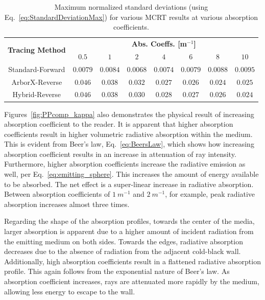\begin{table}
\centering
\caption{Maximum normalized standard deviations (using Eq.~\ref{eq:StandardDeviationMax}) for various MCRT results at various absorption coefficients.}
\begin{tabular}{c c c c c c c c} 
\hline
\multirow{ 2}{*}{\bfseries Tracing Method} & 
\multicolumn{7}{c}{\bfseries Abs. Coeffs. [m$^{-1}$]} \\ [0.5ex] \cline{2-8}
 & $0.5$ & $1$ & $2$ & $4$ & $6$ & $8$ & $10$\\ [0.5ex]
 \hline
 Standard-Forward & $0.0079$ & $0.0084$ & $0.0068$ & $0.0074$ & $0.0079$ & $0.0088$ & $0.0095$\\ [0.5ex] 
 ArborX-Reverse & $0.046$ & $0.038$ & $0.032$ & $0.027$ & $0.026$ & $0.024$ & $0.025$\\ [0.5ex] 
 Hybrid-Reverse & $0.046$ & $0.038$ & $0.030$ & $0.028$ & $0.027$ & $0.026$ & $0.024$\\ [0.5ex] 
 \hline
\end{tabular}
\label{table:PPcomp_std}
\end{table}

Figures~\ref{fig:PPcomp_kappa} also demonstrates the physical result of increasing absorption coefficient to the reader. It is apparent that higher absorption coefficients result in higher volumetric radiative absorption within the medium. 
This is evident from Beer's law, Eq.~\ref{eq:BeersLaw}, which shows how increasing absorption coefficient results in an increase in attenuation of ray intensity.
Furthermore, higher absorption coefficients increase the radiative emission as well, per Eq.~\ref{eq:emitting_sphere}. This increases the amount of energy available to be absorbed. The net effect is a super-linear increase in radiative absorption. Between absorption coefficients of $1~m^{-1}$ and $2~m^{-1}$, for example, peak radiative absorption increases almost three times.

Regarding the shape of the absorption profiles, towards the center of the media, larger absorption is apparent due to a higher amount of incident radiation from the emitting medium on both sides.
Towards the edges, radiative absorption decreases due to the absence of radiation from the adjacent cold-black wall. Additionally, high absorption coefficients result in a flattened radiative absorption profile. This again follows from the exponential nature of Beer's law. As absorption coefficient increases, rays are attenuated more rapidly by the medium, allowing less energy to escape to the wall.

